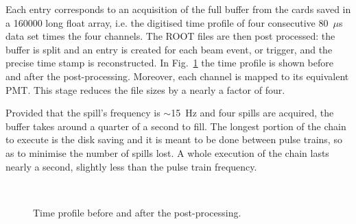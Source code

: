  Each entry corresponds to an acquisition of the full buffer from the cards saved in a 160000 long %
 float array, i.e. the digitised time profile of four consecutive 80~$\mu$s data set times the four channels.
 The ROOT files are then post processed: the buffer is split and an entry is created for each %
 beam event, or trigger, and the precise time stamp is reconstructed.
 In Fig.~\ref{fig:timeprofile} the time profile is shown before and after the post-processing.
 Moreover, each channel is mapped to its equivalent PMT.
 This stage reduces the file sizes by a nearly a factor of four.

 Provided that the spill's frequency is $\sim$15~Hz and four spills are acquired, the buffer %
 takes around a quarter of a second to fill.
 The longest portion of the chain to execute is the disk saving and it is meant to be done %
 between pulse trains, so as to minimise the number of spills lost.
 A whole execution of the chain lasts nearly a second, slightly less than the pulse train frequency.

\begin{figure}
  \centering
  \,
  \caption{Time profile before and after the post-processing.}
  \label{fig:timeprofile}
\end{figure}

